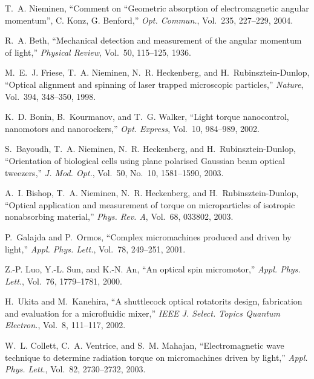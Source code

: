 \begin{thebibliography}{99}
T.~A. Nieminen, ``Comment on ``{G}eometric absorption of electromagnetic
  angular momentum'', {C}. {K}onz, {G}. {B}enford,'' {\em Opt. Commun.},
  Vol.~235, 227--229, 2004.

R.~A. Beth, ``Mechanical detection and measurement of the angular momentum of
  light,'' {\em Physical Review}, Vol.~50, 115--125, 1936.

M.~E.~J. Friese, T.~A. Nieminen, N.~R. Heckenberg, and H.~Rubinsztein-Dunlop,
  ``Optical alignment and spinning of laser trapped microscopic particles,''
  {\em Nature}, Vol.~394, 348--350, 1998.


K.~D. Bonin, B.~Kourmanov, and T.~G. Walker, ``Light torque nanocontrol,
  nanomotors and nanorockers,'' {\em Opt. Express}, Vol.~10, 984--989,
  2002.

S.~Bayoudh, T.~A. Nieminen, N.~R. Heckenberg, and H.~Rubinsztein-Dunlop,
  ``Orientation of biological cells using plane polarised {G}aussian beam
  optical tweezers,'' {\em J. Mod. Opt.}, Vol.~50, No.~10,
  1581--1590, 2003.

A.~I. Bishop, T.~A. Nieminen, N.~R. Heckenberg, and H.~Rubinsztein-Dunlop,
  ``Optical application and measurement of torque on microparticles of
  isotropic nonabsorbing material,'' {\em Phys. Rev. A}, Vol.~68, 033802,
  2003.

P.~Galajda and P.~Ormos, ``Complex micromachines produced and driven by
  light,'' {\em Appl. Phys. Lett.}, Vol.~78, 249--251, 2001.

Z.-P. Luo, Y.-L. Sun, and K.-N. An, ``An optical spin micromotor,'' {\em
  Appl. Phys. Lett.}, Vol.~76, 1779--1781, 2000.

H.~Ukita and M.~Kanehira, ``A shuttlecock optical rotator\textemdash its
  design, fabrication and evaluation for a microfluidic mixer,'' {\em IEEE J.
  Select. Topics Quantum Electron.}, Vol.~8, 111--117, 2002.

W.~L. Collett, C.~A. Ventrice, and S.~M. Mahajan, ``Electromagnetic wave
  technique to determine radiation torque on micromachines driven by light,''
  {\em Appl. Phys. Lett.}, Vol.~82, 2730--2732, 2003.

\end{thebibliography}



